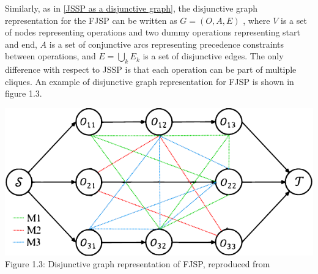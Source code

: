 Similarly, as in \ref{JSSP as a disjunctive graph}, the disjunctive graph representation for the FJSP can be written as $G = (O, A, E)$ \cite{Brandimarte_1993, 9826438, LEI2022117796}, where $V$ is a set of nodes representing operations and two dummy operations representing start and end, $A$ is a set of conjunctive arcs representing precedence constraints between operations, and $E = \bigcup_{k} E_k$ is a set of disjunctive edges. The only difference with respect to JSSP is that each operation can be part of multiple cliques. An example of disjunctive graph representation for FJSP is shown in figure 1.3.
\begin{center}
    \includegraphics[width=0.75\linewidth]{images/fjsp_disjunctive_graph.pdf}\\
    Figure 1.3: Disjunctive graph representation of FJSP, reproduced from \cite{LEI2022117796}
\end{center}
